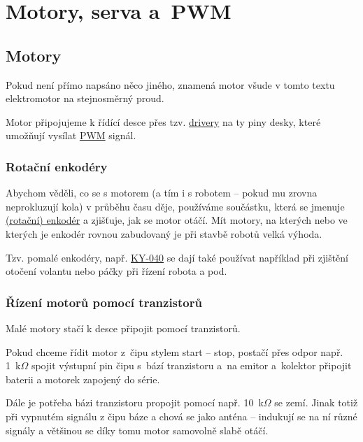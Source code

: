 \section{Motory, serva a~PWM}

\subsection{Motory} \label{motor}

Pokud není přímo napsáno něco jiného, znamená motor všude v tomto textu elektromotor na stejnosměrný proud.

Motor připojujeme k řídící desce přes tzv. \hyperref[driver]{drivery} na ty piny desky, které umožňují vysílat \hyperref[PWM]{PWM} signál. 


\subsubsection{Rotační enkodéry}  \label{enkoder}

Abychom věděli, co se s motorem (a tím i s robotem -- pokud mu zrovna neprokluzují kola) v průběhu času děje, 
používáme součástku, která se jmenuje \href{https://robotika.cz/guide/encoders/en}{(rotační) enkodér} a zjišťuje, jak se motor otáčí. 
Mít motory, na kterých nebo ve kterých je enkodér rovnou zabudovaný je při stavbě robotů velká výhoda. 


Tzv. pomalé enkodéry, např.  \href{https://navody.arduino-shop.cz/navody-k-produktum/rotacni-enkoder-ky-040.html}{KY-040} se dají také používat například při zjištění otočení volantu nebo páčky při řízení robota a pod. 



\subsubsection*{Řízení motorů pomocí tranzistorů}

Malé motory stačí k desce připojit pomocí tranzistorů. %

Pokud chceme řídit motor z~čipu stylem start -- stop, postačí přes odpor 
např. 1~k$\Omega$ spojit výstupní pin čipu s~bází tranzistoru a~na emitor a~kolektor připojit baterii a motorek zapojený do série. 

Dále je potřeba bázi tranzistoru propojit pomocí např. 10~k$\Omega$ se zemí. 
Jinak totiž při vypnutém signálu z čipu báze  a chová se jako anténa -- indukují se na ní různé signály a většinou se díky tomu motor samovolně slabě otáčí.   

